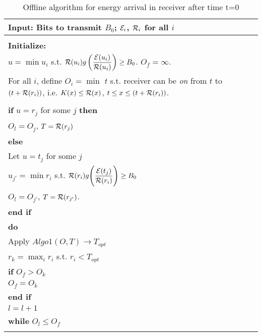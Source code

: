 \begin{table}
\begin{minipage}[b]{8cm}
\caption {Offline algorithm for energy arrival in receiver after time t=0}
\begin{tabular}{p{7cm}}
\hline \textbf{Input}: Bits to transmit $B_0$; $\mathcal{E}_i$, $\mathcal{R}_i$ for all $i$
\\
\hline
\\
\textbf{Initialize:}
\\ 
$u=\min u_i$ s.t. $\mathcal{R}(u_i)g\left( \dfrac{\mathcal{E}(u_i)}{\mathcal{R}(u_i)} \right) \ge B_0$. $O_f=\infty$.
\\
For all $i$, define $O_i=\min$ $t$ s.t. receiver can be \textit{on} from $t$ to $(t+\mathcal{R}(r_i))$, i.e. $K(x) \le \mathcal{R}(x)$,  $t \le x\le (t+\mathcal{R}(r_i))$. 
\\
\\
\textbf{if} $u=r_j$ for some $j$  \textbf{then}
\\
\hspace{4mm}$O_l=O_{j}$, $T=\mathcal{R}(r_j)$
\\
\textbf{else}
\\
\hspace{4mm}Let $u=t_j$ for some $j$
\\
\hspace{4mm}$u_{j'}=\min r_i$ s.t. $\mathcal{R}(r_i)g\Bigg{(} \dfrac{\mathcal{E}(t_j)}{\mathcal{R}(r_i)}\Bigg{)}\ge B_0$
\\
\hspace{4mm}$O_l=O_{j'}$, $T=\mathcal{R}(r_{j'})$.
\\
\textbf{end if}
\\
\textbf{do}
\\
\hspace{4mm}Apply $Algo1(O,T)\rightarrow T_{opt}$
\\
\hspace{4mm}$r_k=\max_i r_i $ s.t. $r_i<T_{opt}$ 
\\
\hspace{4mm}\textbf{if} $O_{f} > O_{k}$
\\
\hspace{7mm}$O_{f} = O_{k}$
\\
\hspace{4mm}\textbf{end if}
\\
\hspace{4mm}$l=l+1$
\\
\textbf{while} $O_l \le O_{f}$
\\
\hline
\label{online}
\end{tabular}
\end{minipage}
\end{table}
